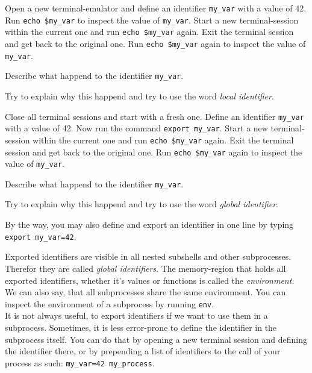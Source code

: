 \begin{challenge}
    \begin{task}
        Open a new terminal-emulator and define an identifier \texttt{my_var} with a value of 42.
        Run \texttt{echo \$my_var} to inspect the value of \texttt{my_var}.
        Start a new terminal-session within the current one and run \texttt{echo \$my_var} again.
        Exit the terminal session and get back to the original one.
        Run \texttt{echo \$my_var} again to inspect the value of \texttt{my_var}.
        \begin{questions}
            \item Describe what happend to the identifier \texttt{my_var}.
            \item Try to explain why this happend and try to use the word \textit{local identifier}.
        \end{questions}
    \end{task}
        
    \begin{task}
        Close all terminal sessions and start with a fresh one.
        Define an identifier \texttt{my_var} with a value of 42.
        Now run the command \texttt{export my_var}.
        Start a new terminal-session within the current one and run \texttt{echo \$my_var} again.
        Exit the terminal session and get back to the original one.
        Run \texttt{echo \$my_var} again to inspect the value of \texttt{my_var}.
        \begin{questions}
            \item Describe what happend to the identifier \texttt{my_var}.
            \item Try to explain why this happend and try to use the word \textit{global identifier}.
        \end{questions}
        By the way, you may also define and export an identifier in one line by typing \texttt{export my_var=42}.
    \end{task}
    
    \begin{task}
        Exported identifiers are visible in all nested subshells and other subprocesses.
        Therefor they are called \textit{global identifiers}.
        The memory-region that holds all exported identifiers, whether it's values or functions is called the \textit{environment}.
        We can also say, that all subprocesses share the same environment.
        You can inspect the environment of a subprocess by running \texttt{env}.\\
        It is not always useful, to export identifiers if we want to use them in a subprocess.
        Sometimes, it is less error-prone to define the identifier in the subprocess itself.
        You can do that by opening a new terminal session and defining the identifier there, or by prepending a list of identifiers to the call of your process as such: \texttt{my_var=42 my_process}.



\end{task}
\end{challenge}

